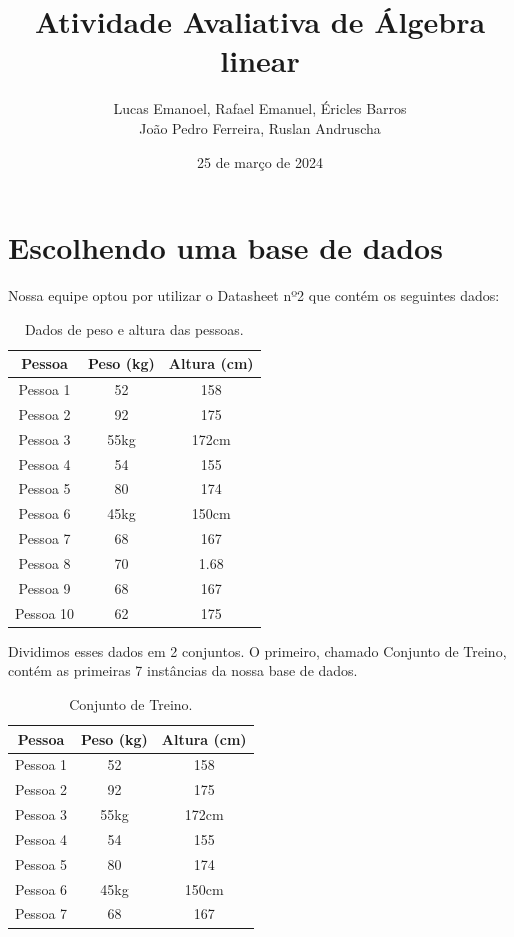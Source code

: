 \documentclass{article}
\title{Atividade Avaliativa de Álgebra linear}
\author{Lucas Emanoel, Rafael Emanuel, Éricles Barros \\João Pedro Ferreira, Ruslan Andruscha}
\date{25 de março de 2024}
\begin{document}
\maketitle


\section{Escolhendo uma base de dados}
    Nossa equipe optou por utilizar o Datasheet nº2 que contém os seguintes dados:
    
    \begin{table}[ht]
        \centering
        \begin{tabular}{|c|c|c|}
        \hline
        \textbf{Pessoa} & \textbf{Peso (kg)} & \textbf{Altura (cm)} \\
        \hline
            Pessoa 1 & 52 & 158 \\
        \hline
            Pessoa 2 & 92 & 175 \\
        \hline
            Pessoa 3 & 55kg & 172cm \\
        \hline
            Pessoa 4 & 54 & 155 \\
        \hline
            Pessoa 5 & 80 & 174 \\
        \hline
            Pessoa 6 & 45kg & 150cm \\
        \hline
            Pessoa 7 & 68 & 167 \\
        \hline
            Pessoa 8 & 70 & 1.68 \\
        \hline
            Pessoa 9 & 68 & 167 \\
        \hline
            Pessoa 10 & 62 & 175 \\
        \hline
        \end{tabular}
        \caption{Dados de peso e altura das pessoas.}
        \label{tab:dados}
    \end{table}
    
    Dividimos esses dados em 2 conjuntos. O primeiro, chamado Conjunto de Treino, contém as primeiras 7 instâncias da nossa base de dados.
    
    \begin{table}[ht]
        \centering
        \begin{tabular}{|c|c|c|}
        \hline
        \textbf{Pessoa} & \textbf{Peso (kg)} & \textbf{Altura (cm)} \\
        \hline
            Pessoa 1 & 52 & 158 \\
        \hline
            Pessoa 2 & 92 & 175 \\
        \hline
            Pessoa 3 & 55kg & 172cm \\
        \hline
            Pessoa 4 & 54 & 155 \\
        \hline
            Pessoa 5 & 80 & 174 \\
        \hline
            Pessoa 6 & 45kg & 150cm \\
        \hline
            Pessoa 7 & 68 & 167 \\
        \hline
        \end{tabular}
        \caption{Conjunto de Treino.}
        \label{tab:treino}
    \end{table}
    
\end{document}
